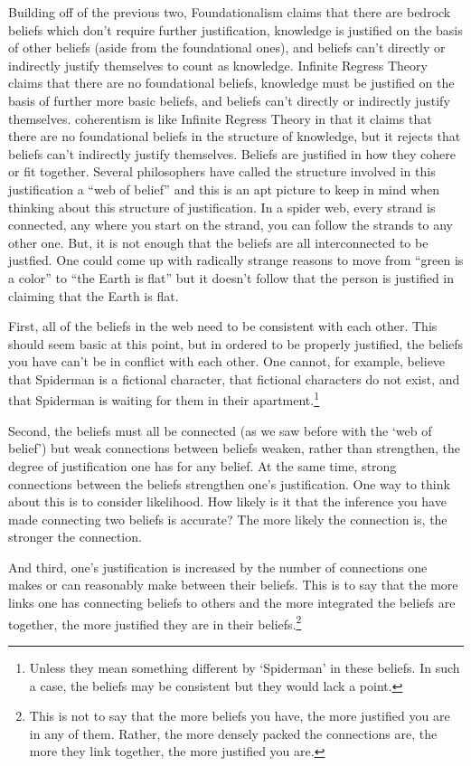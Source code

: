 Building off of the previous two, Foundationalism claims that there are bedrock beliefs which don't require further justification, knowledge is justified on the basis of other beliefs (aside from the foundational ones), and beliefs can't directly or indirectly justify themselves to count as knowledge. Infinite Regress Theory claims that there are no foundational beliefs, knowledge must be justified on the basis of further more basic beliefs, and beliefs can't directly or indirectly justify themselves.  \Gls{coherentism} is like Infinite Regress Theory in that it claims that there are no foundational beliefs in the structure of knowledge, but it rejects that beliefs can't indirectly justify themselves. Beliefs are justified in how they cohere or fit together. Several philosophers have called the structure involved in this justification a ``web of belief''\autocite{Quine1} and this is an apt picture to keep in mind when thinking about this structure of justification. In a spider web, every strand is connected, any where you start on the strand, you can follow the strands to any other one. But, it is not enough that the beliefs are all interconnected to be justfied. One could come up with radically strange reasons to move from ``green is a color'' to ``the Earth is flat'' but it doesn't follow that the person is justified in claiming that the Earth is flat.  

First, all of the beliefs in the web need to be consistent with each other. This should seem basic at this point, but in ordered to be properly justified, the beliefs you have can't be in conflict with each other. One cannot, for example, believe that Spiderman is a fictional character, that fictional characters do not exist, and that Spiderman is waiting for them in their apartment.\footnote{Unless they mean something different by `Spiderman' in these beliefs. In such a case, the beliefs may be consistent but they would lack a point.} 

Second, the beliefs must all be connected (as we saw before with the `web of belief') but weak connections between beliefs weaken, rather than strengthen, the degree of justification one has for any belief. At the same time, strong connections between the beliefs strengthen one's justification. One way to think about this is to consider likelihood. How likely is it that the inference you have made connecting two beliefs is accurate? The more likely the connection is, the stronger the connection. 

And third, one's justification is increased by the number of connections one makes or can reasonably make between their beliefs. This is to say that the more links one has connecting beliefs to others and the more integrated the beliefs are together, the more justified they are in their beliefs.\footnote{This is not to say that the more beliefs you have, the more justified you are in any of them. Rather, the more densely packed the connections are, the more they link together, the more justified you are.}   

